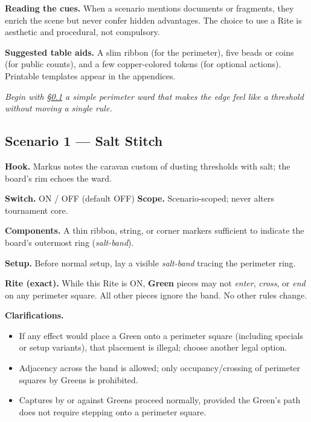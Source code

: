 \documentclass[11pt]{article}
\begin{document}
\medskip
\noindent\textbf{Reading the cues.} When a scenario mentions documents or fragments, they enrich the scene but never confer hidden advantages. The choice to use a Rite is aesthetic and procedural, not compulsory.

\medskip
\noindent\textbf{Suggested table aids.} A slim ribbon (for the perimeter), five beads or coins (for public counts), and a few copper-colored tokens (for optional actions). Printable templates appear in the appendices.

\medskip
\noindent\textit{Begin with \S\ref{scen:salt-stitch} \textemdash{} a simple perimeter ward that makes the edge feel like a threshold without moving a single rule.}

\subsection{Scenario 1 — Salt Stitch}
\label{scen:salt-stitch}

\noindent\textbf{Hook.} Markus notes the caravan custom of dusting thresholds with salt; the board’s rim echoes the ward.

\medskip
\noindent\textbf{Switch.} \textsc{ON / OFF} (default \textsc{OFF}) \hfill \textbf{Scope.} Scenario-scoped; never alters tournament core.

\medskip
\noindent\textbf{Components.} A thin ribbon, string, or corner markers sufficient to indicate the board’s outermost ring (\emph{salt-band}).

\medskip
\noindent\textbf{Setup.} Before normal setup, lay a visible \emph{salt-band} tracing the perimeter ring.

\medskip
\noindent\textbf{Rite (exact).} While this Rite is \textsc{ON}, \textbf{Green} pieces may not \emph{enter}, \emph{cross}, or \emph{end} on any perimeter square. All other pieces ignore the band. No other rules change.

\medskip
\noindent\textbf{Clarifications.}
\begin{itemize}\setlength\itemsep{0.25em}
  \item If any effect would place a Green onto a perimeter square (including specials or setup variants), that placement is illegal; choose another legal option.
  \item Adjacency across the band is allowed; only occupancy/crossing of perimeter squares by Greens is prohibited.
  \item Captures by or against Greens proceed normally, provided the Green’s path does not require stepping onto a perimeter square.
\end{itemize}
\end{document}
